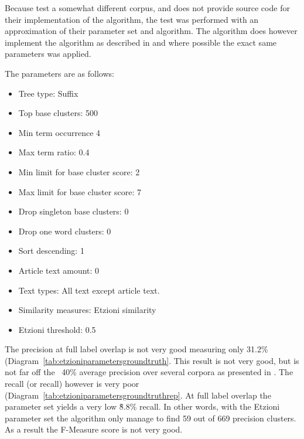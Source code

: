 Because \citeauthor{Oren1998} test a somewhat different corpus, and does not provide source code for their implementation of the \STC algorithm, the test was performed with an approximation of their parameter set and algorithm. The \CTC algorithm does however implement the \STC algorithm as described in  and where possible the exact same parameters was applied.

The parameters are as follows:
\begin{itemize}
  \item Tree type: Suffix
  \item Top base clusters: 500
  \item Min term occurrence 4
  \item Max term ratio: 0.4
  \item Min limit for base cluster score: 2
  \item Max limit for base cluster score: 7
  \item Drop singleton base clusters: 0
  \item Drop one word clusters: 0
  \item Sort descending: 1
  \item Article text amount: 0
  \item Text types: All text except article text.
  \item Similarity measures: Etzioni similarity
  \item Etzioni threshold: 0.5
\end{itemize}

The precision at full label overlap is not very good measuring only 31.2\% (Diagram~\ref{tab:etzioniparametersgroundtruth}. This result is not very good, but is not far off the ~40\% average precision over several corpora as presented in \cite{Oren1998}. The recall (or recall) however is very poor (Diagram~\ref{tab:etzioniparametersgroundtruthrep}. At full label overlap the parameter set yields a very low \~8.8\% recall. In other words, with the Etzioni parameter set the algorithm only manage to find 59 out of 669 precision clusters. As a result the F-Measure score is not very good. 

